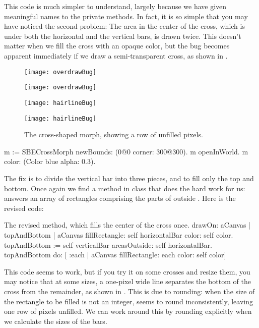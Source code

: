 \documentclass[a4paper,10pt,twoside]{book}
\begin{document}
This code is much simpler to understand, largely because we have given meaningful names to the private methods.
In fact, it is so simple that you may have noticed the second problem:
The area in the center of the cross, which is under both the horizontal and the vertical bars, is drawn twice.  
This doesn't matter when we fill the cross with an opaque color, but the bug becomes apparent immediately if we draw a semi-transparent cross, as shown in .

\begin{figure}[t]
\begin{minipage}{0.48\textwidth}
	\ifluluelse
		{\centerline{\texttt{[image: overdrawBug]}}}
		{\centerline{\texttt{[image: overdrawBug]}}}
	\caption{The center of the cross is filled twice with the color.
		\label{fig:overdrawBug}}
\end{minipage}
\hfill
\begin{minipage}{0.48\textwidth}
	\ifluluelse
		{\centerline{\texttt{[image: hairlineBug]}}}
		{\centerline{\texttt{[image: hairlineBug]}}}
	\caption{The cross-shaped morph, showing a row of unfilled pixels.
		\label{fig:bug}}
\end{minipage}
\end{figure}


\begin{code}{}
m := SBECrossMorph newBounds: (0@0 corner: 300@300).
m openInWorld.
m color: (Color blue alpha: 0.3).

\end{code}

\noindent
The fix is to divide the vertical bar into three pieces, and to fill only the top and bottom.  
Once again we find a method in class  that does the hard work for us:  answers an array of rectangles comprising the parts of  outside .
Here is the revised code:

\begin{method}{The revised  method, which fills the center of the cross once.}
drawOn: aCanvas 
	| topAndBottom |
	aCanvas fillRectangle: self horizontalBar color: self color.
	topAndBottom := self verticalBar areasOutside: self horizontalBar. 
	topAndBottom do: [ :each | aCanvas fillRectangle: each color: self color]
\end{method}

This code seems to work, but if you try it on some crosses and resize them, you may notice that at some sizes, a one-pixel wide line separates the bottom of the cross from the remainder, as shown in .
This is due to rounding: when the size of the rectangle to be filled is not an integer, 
seems to round inconsistently, leaving one row of pixels unfilled.
We can work around this by rounding explicitly when we calculate the sizes of the bars.
\end{document}
